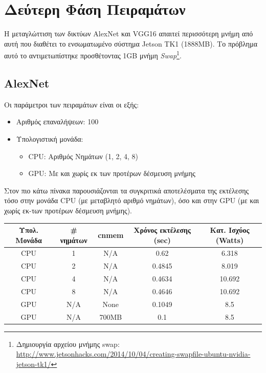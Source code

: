 \section{Δεύτερη Φάση Πειραμάτων}
\label{sec:experiments_phase2}

Η μεταγλώττιση των δικτύων AlexNet και VGG16 απαιτεί περισσότερη
μνήμη από αυτή που διαθέτει το ενσωματωμένο σύστημα Jetson TK1 (1888MB).
Το πρόβλημα αυτό το αντιμετωπίστηκε προσθέτοντας 1GB μνήμη
\emph{Swap}\footnote{Δημιουργία αρχείου μνήμης swap: \url{http://www.jetsonhacks.com/2014/10/04/creating-swapfile-ubuntu-nvidia-jetson-tk1/}}.


\subsection{AlexNet}

Οι παράμετροι των πειραμάτων είναι οι εξής:
\begin{itemize}
  \item{Αριθμός επαναλήψεων: 100}
  \item{Υπολογιστική μονάδα:}
    \begin{itemize}
      \item{CPU: Αριθμός Νημάτων (1, 2, 4, 8)}
      \item{GPU: Με και χωρίς εκ των προτέρων δέσμευση μνήμης}
    \end{itemize}
\end{itemize}


Στον πιο κάτω πίνακα παρουσιάζονται τα συγκριτικά αποτελέσματα της
εκτέλεσης τόσο στην μονάδα CPU (με μεταβλητό αριθμό νημάτων), όσο και στην
GPU (με και χωρίς εκ-των προτέρων δέσμευση μνήμης).

\begin{center}
  \small
  \begin{tabular}[center]{ | c | c | c | c | c | }
    \hline
    \rowcolor{Gray}
    Υπολ. Μονάδα & \# νημάτων & cnmem & Χρόνος εκτέλεσης (sec) & Κατ. Ισχύος (Watts) \\
    \hline
    CPU & 1 & N/A & 0.62 & 6.318\\
    CPU & 2 & N/A & 0.4845 & 8.019\\
    CPU & 4 & N/A & 0.4634 & 10.692\\
    CPU & 8 & N/A & 0.4646 & 10.692\\
    GPU & N/A & None & 0.1049 & 8.5\\
    GPU & N/A & 700MB & 0.1 & 8.5\\
    \hline
  \end{tabular}
\end{center}

